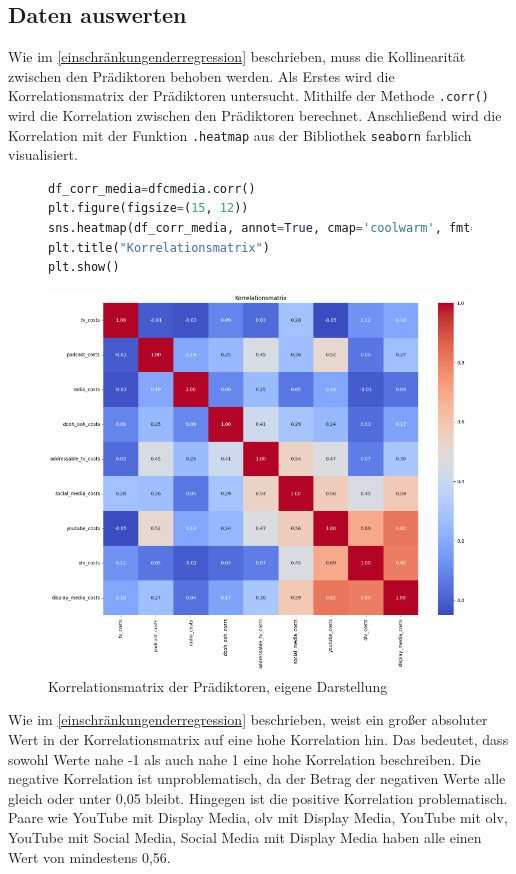 \subsection{Daten auswerten}
Wie im \autoref{einschränkungenderregression} beschrieben, muss die Kollinearität zwischen den Prädiktoren behoben werden. Als Erstes wird die Korrelationsmatrix der Prädiktoren untersucht. Mithilfe der Methode \verb|.corr()| wird die Korrelation zwischen den Prädiktoren berechnet. Anschließend wird die Korrelation mit der Funktion \verb|.heatmap| aus der Bibliothek \verb|seaborn| farblich visualisiert.
\begin{figure}[H]
    \centering
    \begin{lstlisting}[language=Python, linewidth=\textwidth]
df_corr_media=dfcmedia.corr() 
plt.figure(figsize=(15, 12))
sns.heatmap(df_corr_media, annot=True, cmap='coolwarm', fmt=".2f")
plt.title("Korrelationsmatrix")
plt.show()
\end{lstlisting}
    \includegraphics[width=1\linewidth]{images/korrelationsmatrix.png}
    \caption{Korrelationsmatrix der Prädiktoren, eigene Darstellung}
    \label{fig:korrelationsmatrix}
\end{figure}
Wie im \autoref{einschränkungenderregression} beschrieben, weist ein großer absoluter Wert in der Korrelationsmatrix auf eine hohe Korrelation hin. Das bedeutet, dass sowohl Werte nahe -1 als auch nahe 1 eine hohe Korrelation beschreiben. Die negative Korrelation ist unproblematisch, da der Betrag der negativen Werte alle gleich oder unter 0,05 bleibt. Hingegen ist die positive Korrelation problematisch. Paare wie YouTube mit Display Media, \ac{olv} mit Display Media, YouTube mit \ac{olv}, YouTube mit Social Media, Social Media mit Display Media haben alle einen Wert von mindestens 0,56. \\\\
